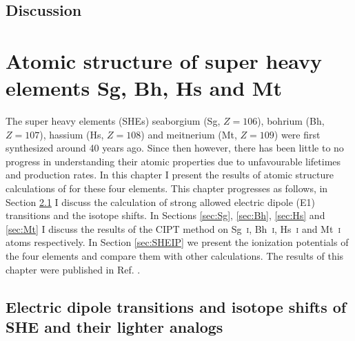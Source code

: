 \documentclass[10pt,a4paper, twoside, openright]{report}
\begin{document}
\section{Discussion}
\chapter{Atomic structure of super heavy elements Sg, Bh, Hs and Mt} \label{chap:106}
The super heavy elements (SHEs) seaborgium (Sg, $Z=106$), bohrium (Bh, $Z=107$), hassium (Hs, $Z=108$) and meitnerium (Mt, $Z=109$) were first synthesized around 40 years ago. Since then however, there has been little to no progress in understanding their atomic properties due to unfavourable lifetimes and production rates. In this chapter I present the results of atomic structure calculations of for these four elements. This chapter progresses as follows, in Section \ref{sec:Isoshift} I discuss the calculation of strong allowed electric dipole (E1) transitions and the isotope shifts. In Sections  \ref{sec:Sg}, \ref{sec:Bh}, \ref{sec:Hs} and \ref{sec:Mt} I discuss the results of the CIPT method on  Sg~\textsc{i}, Bh~\textsc{i}, Hs~\textsc{i} and Mt~\textsc{i} atoms respectively.  In Section \ref{sec:SHEIP} we present the ionization potentials of the four elements and compare them with other calculations.  The results of this chapter were published in Ref. \cite{LDFSg2019}.


\section{Electric dipole transitions and isotope shifts of SHE and their lighter analogs} \label{sec:Isoshift}
\end{document}
